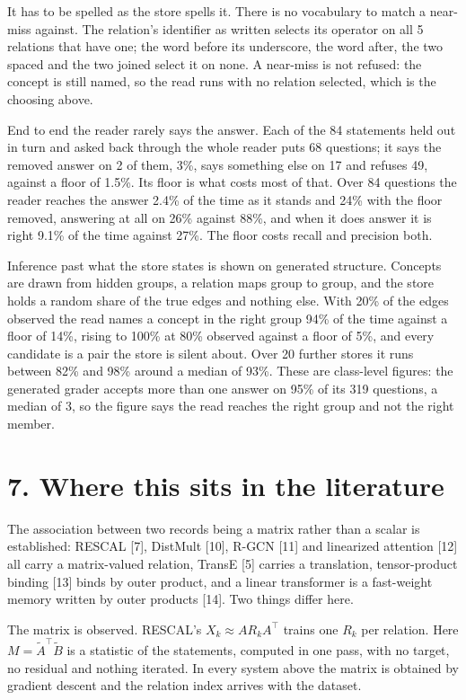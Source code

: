 \documentclass[10pt,letterpaper,twocolumn]{article}
\begin{document}
It has to be spelled as the store spells it. There is no vocabulary to match a near-miss against.
The relation's identifier as written selects its operator on all 5 relations that have one; the word
before its underscore, the word after, the two spaced and the two joined select it on none. A
near-miss is not refused: the concept is still named, so the read runs with no relation selected,
which is the choosing above.

End to end the reader rarely says the answer. Each of the 84 statements held out in turn and asked
back through the whole reader puts 68 questions; it says the removed answer on 2 of them, 3\%, says
something else on 17 and refuses 49, against a floor of 1.5\%. Its floor is what costs most of that.
Over 84 questions the reader reaches the answer 2.4\% of the time as it stands and 24\% with the floor
removed, answering at all on 26\% against 88\%, and when it does answer it is right 9.1\% of the time
against 27\%. The floor costs recall and precision both.

Inference past what the store states is shown on generated structure. Concepts are drawn from hidden
groups, a relation maps group to group, and the store holds a random share of the true edges and
nothing else. With 20\% of the edges observed the read names a concept in the right group 94\% of the
time against a floor of 14\%, rising to 100\% at 80\% observed against a floor of 5\%, and every candidate
is a pair the store is silent about. Over 20 further stores it runs between 82\% and 98\% around a
median of 93\%. These are class-level figures: the generated grader accepts more than one answer on
95\% of its 319 questions, a median of 3, so the figure says the read reaches the right group and not
the right member.

\section{7. Where this sits in the literature}\label{7-where-this-sits-in-the-literature}

The association between two records being a matrix rather than a scalar is established: RESCAL {[}7{]},
DistMult {[}10{]}, R-GCN {[}11{]} and linearized attention {[}12{]} all carry a matrix-valued relation, TransE
{[}5{]} carries a translation, tensor-product binding {[}13{]} binds by outer product, and a linear
transformer is a fast-weight memory written by outer products {[}14{]}. Two things differ here.

The matrix is observed. RESCAL's \(X_k \approx A R_k A^\top\) trains one \(R_k\) per relation. Here
\(M = \tilde{A}^\top \tilde{B}\) is a statistic of the statements, computed in one pass, with no target,
no residual and nothing iterated. In every system above the matrix is obtained by gradient descent
and the relation index arrives with the dataset.
\end{document}
